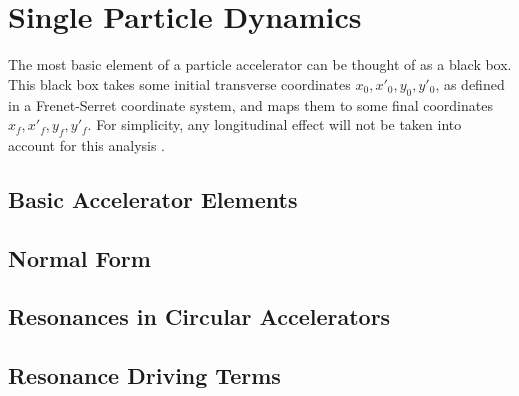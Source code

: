 \chapter{Single Particle Dynamics}
The most basic element of a particle accelerator can be thought of as a black box. This black box takes some initial transverse coordinates $x_0,x'_0,y_0,y'_0$, as defined in a Frenet-Serret coordinate system, and maps them to some final coordinates $x_f,x'_f,y_f,y'_f$. For simplicity, any longitudinal effect will not be taken into account for this analysis \cite{rr1} \cite{rr2} \cite{wolski} \cite{pipII1}.    

\section{Basic Accelerator Elements}

\section{Normal Form}

\section{Resonances in Circular Accelerators}

\section{Resonance Driving Terms}
